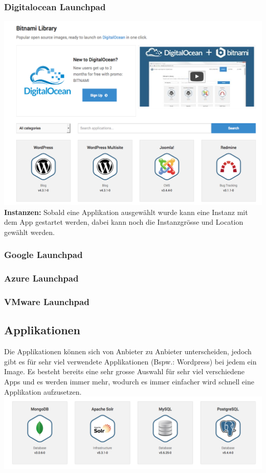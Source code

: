 \documentclass[11pt]{scrartcl}
\begin{document}
\subsubsection{Digitalocean Launchpad}
\includegraphics[width=\textwidth]{digitalocean_launchpad}
\textbf{Instanzen:}
Sobald eine Applikation ausgewählt wurde kann eine Instanz mit dem App gestartet 
werden, dabei kann noch die Instanzgrösse und Location gewählt werden.



\subsubsection{Google Launchpad}

\subsubsection{Azure Launchpad}

\subsubsection{VMware Launchpad}


\subsection{Applikationen}
Die Applikationen können sich von Anbieter zu Anbieter unterscheiden, jedoch 
gibt es für sehr viel verwendete Applikationen (Bspw.: Wordpress) bei jedem ein 
Image.
Es besteht bereits eine sehr grosse Auswahl für sehr viel verschiedene Apps und 
es werden immer mehr, wodurch es immer einfacher wird schnell eine Applikation 
aufzusetzen.
\includegraphics[width=\textwidth]{apps}
\end{document}
